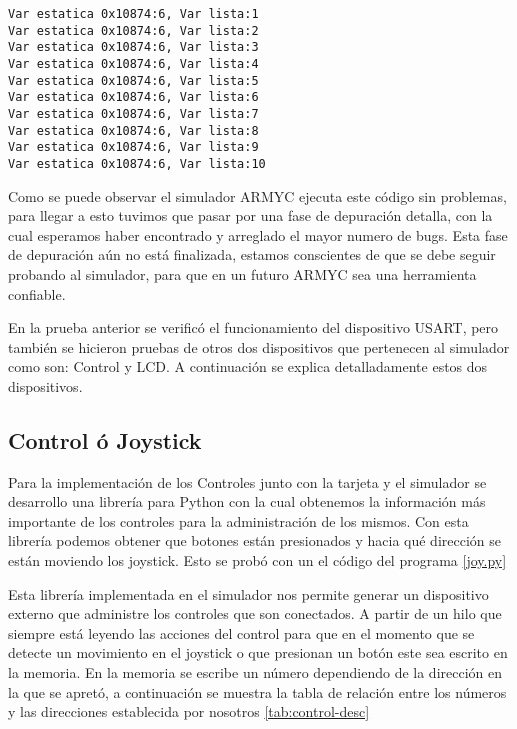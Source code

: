 \begin{verbatim}
Var estatica 0x10874:6, Var lista:1
Var estatica 0x10874:6, Var lista:2
Var estatica 0x10874:6, Var lista:3
Var estatica 0x10874:6, Var lista:4
Var estatica 0x10874:6, Var lista:5
Var estatica 0x10874:6, Var lista:6
Var estatica 0x10874:6, Var lista:7
Var estatica 0x10874:6, Var lista:8
Var estatica 0x10874:6, Var lista:9
Var estatica 0x10874:6, Var lista:10
\end{verbatim}

Como se puede observar el simulador ARMYC ejecuta este código sin problemas, para llegar a esto tuvimos que pasar por una fase de depuración detalla, con la cual esperamos haber encontrado y arreglado el mayor numero de bugs. Esta fase de depuración aún no está finalizada, estamos conscientes de que se debe seguir probando al simulador, para que en un futuro ARMYC sea una herramienta confiable.

En la prueba anterior se verificó el funcionamiento del dispositivo USART, pero también se hicieron pruebas de otros dos dispositivos que pertenecen al simulador como son: Control y LCD. A continuación se explica detalladamente estos dos dispositivos.

\subsection{Control ó Joystick}

Para la implementación de los Controles junto con la tarjeta y el simulador se desarrollo una librería para Python con la cual obtenemos la información más importante de los controles para la administración de los mismos. Con esta librería podemos obtener que botones están presionados y hacia qué dirección se están moviendo los joystick. Esto se probó con un el código del programa \ref{joy.py}



Esta librería implementada en el simulador nos permite generar un dispositivo externo que administre los controles que son conectados. A partir de un hilo que siempre está leyendo las acciones del control para que en el momento que se detecte un movimiento en el joystick o que presionan un botón este sea escrito en la memoria. En la memoria se escribe un número dependiendo de la dirección en la que se apretó, a continuación se muestra la tabla de relación entre los números y las direcciones establecida por nosotros \ref{tab:control-desc}

